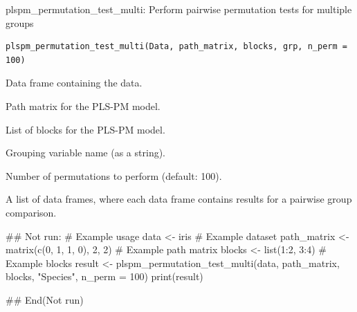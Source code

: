 \documentclass[a4paper]{book}
\begin{document}
%
\begin{Description}
plspm\_permutation\_test\_multi: Perform pairwise permutation tests for multiple groups
\end{Description}
%
\begin{Usage}
\begin{verbatim}
plspm_permutation_test_multi(Data, path_matrix, blocks, grp, n_perm = 100)
\end{verbatim}
\end{Usage}
%
\begin{Arguments}
\begin{ldescription}
\item[\code{Data}] Data frame containing the data.

\item[\code{path\_matrix}] Path matrix for the PLS-PM model.

\item[\code{blocks}] List of blocks for the PLS-PM model.

\item[\code{grp}] Grouping variable name (as a string).

\item[\code{n\_perm}] Number of permutations to perform (default: 100).
\end{ldescription}
\end{Arguments}
%
\begin{Value}
A list of data frames, where each data frame contains results for a pairwise group comparison.
\end{Value}
%
\begin{Examples}
\begin{ExampleCode}
\#\# Not run: 
# Example usage
data <- iris  # Example dataset
path_matrix <- matrix(c(0, 1, 1, 0), 2, 2)  # Example path matrix
blocks <- list(1:2, 3:4)  # Example blocks
result <- plspm_permutation_test_multi(data, path_matrix, blocks, "Species", n_perm = 100)
print(result)

## End(Not run)
\end{ExampleCode}
\end{Examples}
\end{document}
